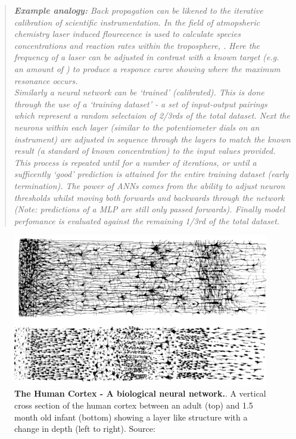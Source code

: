 \begin{quote}
\textit{
\textbf{Example analogy:} Back propagation can be likened to the iterative calibration of scientific instrumentation. In the field of atmopsheric chemistry laser induced flourecence is used to calculate species concentrations and reaction rates within the troposphere, \citep{lif1,lif2}. Here the frequency of a laser can be adjusted in contrast with a known target (e.g. an amount of ) to produce a responce curve showing where the maximum resonance occurs.\\
Similarly a neural network can be `trained' (calibrated). 
This is done through the use of a `training dataset' - a set of input-output pairings which represent a random selectaion of 2/3rds of the total dataset. Next the neurons within each layer (similar to the potentiometer dials on an instrument) are adjusted in sequence through the layers to match the known result (a standard of known concentration) to the input values provided. This process is repeated until for a number of iterations, or until a sufficently `good' prediction is attained for the entire training dataset (early termination). The power of ANNs comes from the ability to adjust neuron thresholds whilst moving both forwards and backwards through the network (Note: predictions of a MLP are still only passed forwards). Finally model perfomance is evaluated against the remaining 1/3rd of the total dataset.
}
\end{quote}


\begin{figure}[H]
     \centering
         \includegraphics[width=.85\textwidth]{figures_c3/mlpregressor/Cajal_cortex_drawings.png}
        \caption{\textbf{The Human Cortex - A biological neural network.}. A vertical cross section of the human cortex between an adult (top) and 1.5 month old infant (bottom) showing a layer like structure with a change in depth (left to right). Source: \cite{layercortex}}
        \label{fig:layercortex}
\end{figure}

